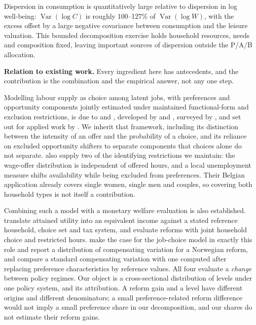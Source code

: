 \documentclass[11pt,a4paper]{article}
\begin{document}
Dispersion in consumption is quantitatively large relative to dispersion in log well-being: \(\operatorname{Var}(\log C)\) is roughly 100--127\% of \(\operatorname{Var}(\log W)\), with the excess offset by a large negative covariance between consumption and the leisure valuation. This bounded decomposition exercise holds household resources, needs and composition fixed, leaving important sources of dispersion outside the P/A/B allocation.

\textbf{Relation to existing work.} Every ingredient here has antecedents, and the contribution is the combination and the empirical answer, not any one step.

Modelling labour supply as choice among latent jobs, with preferences and opportunity components jointly estimated under maintained functional-form and exclusion restrictions, is due to \citet{aaberge1995} and \citet{aaberge1999}, developed by \citet{dagsvikstrom2006} and \citet{dagsvikjia2016}, surveyed by \citet{aaberge2018}, and set out for applied work by \citet{capeau2016}. We inherit that framework, including its distinction between the intensity of an offer and the probability of a choice, and its reliance on excluded opportunity shifters to separate components that choices alone do not separate. \citet{capeau2016} also supply two of the identifying restrictions we maintain: the wage-offer distribution is independent of offered hours, and a local unemployment measure shifts availability while being excluded from preferences. Their Belgian application already covers single women, single men and couples, so covering both household types is not itself a contribution.

Combining such a model with a monetary welfare evaluation is also established. \citet{aaberge1995} translate attained utility into an equivalent income against a stated reference household, choice set and tax system, and \citet{aaberge2004} evaluate reforms with joint household choice and restricted hours. \citet{jiathoresen2021} make the case for the job-choice model in exactly this role and report a distribution of compensating variation for a Norwegian reform, and \citet{jacquet2026} compare a standard compensating variation with one computed after replacing preference characteristics by reference values. All four evaluate a \emph{change} between policy regimes. Our object is a cross-sectional distribution of levels under one policy system, and its attribution. A reform gain and a level have different origins and different denominators; a small preference-related reform difference would not imply a small preference share in our decomposition, and our shares do not estimate their reform gains.
\end{document}
